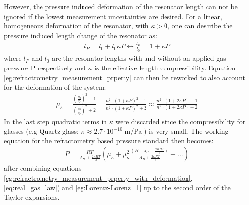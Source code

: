 However, the pressure induced deformation of the resonator length can not be ignored if the lowest measurement uncertainties are desired. For a linear, homogeneous deformation of the resonator, with $\kappa >0$, one can describe the pressure induced length change of the resonator as:
\begin{align}
	l_P=l_0+l_0\kappa P \leftrightarrow \frac{l_P}{l_0}=1+\kappa P
	\label{eg:refractometer_length_change}
\end{align}
where $l_P$ and $l_0$ are the resonator lengths with and without an applied gas pressure P respectively and $\kappa$ is the effective length compressibility. Equation \ref{eg:refractrometry_measurement_prperty} can then be reworked to also account for the deformation of the system:
\begin{align}
	\mu_{\kappa}=\frac{(\frac{\nu_0}{\nu_P})^2-1}{(\frac{\nu_0}{\nu_p})^2+2}=\frac{n^2\cdot(1+\kappa P)^2 -1}{n^2\cdot(1+\kappa P)^2 +2} \approx \frac{n^2\cdot(1+2\kappa P) -1}{n^2\cdot(1+2\kappa P) +2}
	\label{eg:refractrometry_measurement_prperty_with_deformation}
\end{align}
In the last step quadratic terms in $\kappa$ were discarded since the compressibility for glasses (e.g Quartz glass: $\kappa \approx 2.7 \cdot 10^{-10}$ m/Pa ) is very small. The working equation for the refractometry based pressure standard then becomes:
\begin{align}
	P=\frac{RT}{A_R+\frac{2\kappa RT}{3}}\left(\mu_{\kappa}+\mu_{\kappa}^2\frac{(B-b_R-\frac{2\kappa RT}{3})}{A_R+\frac{2\kappa RT}{3}}+...\right)
	\label{eg:experimental_formular_refractometry_kength_corrected}
\end{align}
after combining equations \ref{eg:refractrometry_measurement_prperty_with_deformation}, \ref{eq:real_gas_law}) and \ref{eg:Lorentz-Lorenz_1} up to the second order of the Taylor expansions.
